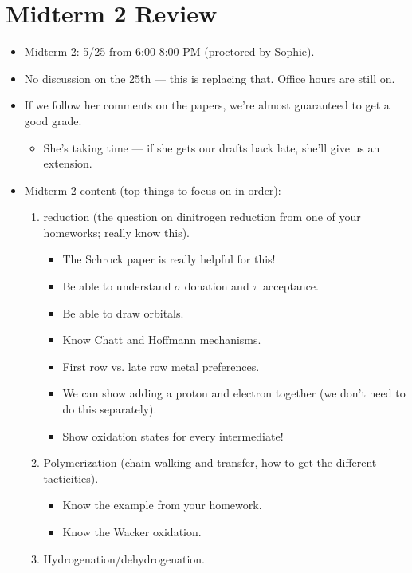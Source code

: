 \documentclass[../notes.tex]{subfiles}
\begin{document}
\section{Midterm 2 Review}
\begin{itemize}
    \item {}Midterm 2: 5/25 from 6:00-8:00 PM (proctored by Sophie).
    \item No discussion on the 25th --- this is replacing that. Office hours are still on.
    \item If we follow her comments on the papers, we're almost guaranteed to get a good grade.
    \begin{itemize}
        \item She's taking time --- if she gets our drafts back late, she'll give us an extension.
    \end{itemize}
    \item Midterm 2 content (top things to focus on in order):
    \begin{enumerate}
        \item {} reduction (the question on dinitrogen reduction from one of your homeworks; really know this).
        \begin{itemize}
            \item The Schrock paper is really helpful for this!
            \item Be able to understand $\sigma$ donation and $\pi$ acceptance.
            \item Be able to draw orbitals.
            \item Know Chatt and Hoffmann mechanisms.
            \item First row vs. late row metal preferences.
            \item We can show adding a proton and electron together (we don't need to do this separately).
            \item Show oxidation states for every intermediate!
        \end{itemize}
        \item Polymerization (chain walking and transfer, how to get the different tacticities).
        \begin{itemize}
            \item Know the example from your homework.
            \item Know the Wacker oxidation.
        \end{itemize}
        \item Hydrogenation/dehydrogenation.

\end{enumerate}
\end{itemize}
\end{document}

